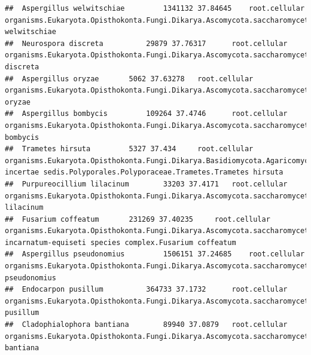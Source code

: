 \documentclass{article}\usepackage[]{graphicx}\usepackage[]{color}
\makeatletter
\newenvironment{kframe}{%
 \def\at@end@of@kframe{}%
 \ifinner\ifhmode%
  \def\at@end@of@kframe{\end{minipage}}%
  \begin{minipage}{\columnwidth}%
 \fi\fi%
 \def\FrameCommand##1{\hskip\@totalleftmargin \hskip-\fboxsep
 \colorbox{shadecolor}{##1}\hskip-\fboxsep
     \hskip-\linewidth \hskip-\@totalleftmargin \hskip\columnwidth}%
 \MakeFramed {\advance\hsize-\width
   \@totalleftmargin\z@ \linewidth\hsize
   \@setminipage}}%
 {\par\unskip\endMakeFramed%
 \at@end@of@kframe}
\newenvironment{knitrout}{}{} %
\makeatother
\begin{document}
\begin{knitrout}
\begin{kframe}
\begin{verbatim}
##  Aspergillus welwitschiae 		 1341132 37.84645 	 root.cellular organisms.Eukaryota.Opisthokonta.Fungi.Dikarya.Ascomycota.saccharomyceta.Pezizomycotina.leotiomyceta.Eurotiomycetes.Eurotiomycetidae.Eurotiales.Aspergillaceae.Aspergillus.Aspergillus welwitschiae
##  Neurospora discreta 		 29879 37.76317 	 root.cellular organisms.Eukaryota.Opisthokonta.Fungi.Dikarya.Ascomycota.saccharomyceta.Pezizomycotina.leotiomyceta.sordariomyceta.Sordariomycetes.Sordariomycetidae.Sordariales.Sordariaceae.Neurospora.Neurospora discreta
##  Aspergillus oryzae 		 5062 37.63278 	 root.cellular organisms.Eukaryota.Opisthokonta.Fungi.Dikarya.Ascomycota.saccharomyceta.Pezizomycotina.leotiomyceta.Eurotiomycetes.Eurotiomycetidae.Eurotiales.Aspergillaceae.Aspergillus.Circumdati.Aspergillus oryzae
##  Aspergillus bombycis 		 109264 37.4746 	 root.cellular organisms.Eukaryota.Opisthokonta.Fungi.Dikarya.Ascomycota.saccharomyceta.Pezizomycotina.leotiomyceta.Eurotiomycetes.Eurotiomycetidae.Eurotiales.Aspergillaceae.Aspergillus.Aspergillus bombycis
##  Trametes hirsuta 		 5327 37.434 	 root.cellular organisms.Eukaryota.Opisthokonta.Fungi.Dikarya.Basidiomycota.Agaricomycotina.Agaricomycetes.Agaricomycetes incertae sedis.Polyporales.Polyporaceae.Trametes.Trametes hirsuta
##  Purpureocillium lilacinum 		 33203 37.4171 	 root.cellular organisms.Eukaryota.Opisthokonta.Fungi.Dikarya.Ascomycota.saccharomyceta.Pezizomycotina.leotiomyceta.sordariomyceta.Sordariomycetes.Hypocreomycetidae.Hypocreales.Ophiocordycipitaceae.Purpureocillium.Purpureocillium lilacinum
##  Fusarium coffeatum 		 231269 37.40235 	 root.cellular organisms.Eukaryota.Opisthokonta.Fungi.Dikarya.Ascomycota.saccharomyceta.Pezizomycotina.leotiomyceta.sordariomyceta.Sordariomycetes.Hypocreomycetidae.Hypocreales.Nectriaceae.Fusarium.Fusarium incarnatum-equiseti species complex.Fusarium coffeatum
##  Aspergillus pseudonomius 		 1506151 37.24685 	 root.cellular organisms.Eukaryota.Opisthokonta.Fungi.Dikarya.Ascomycota.saccharomyceta.Pezizomycotina.leotiomyceta.Eurotiomycetes.Eurotiomycetidae.Eurotiales.Aspergillaceae.Aspergillus.Aspergillus pseudonomius
##  Endocarpon pusillum 		 364733 37.1732 	 root.cellular organisms.Eukaryota.Opisthokonta.Fungi.Dikarya.Ascomycota.saccharomyceta.Pezizomycotina.leotiomyceta.Eurotiomycetes.Chaetothyriomycetidae.Verrucariales.Verrucariaceae.Endocarpon.Endocarpon pusillum
##  Cladophialophora bantiana 		 89940 37.0879 	 root.cellular organisms.Eukaryota.Opisthokonta.Fungi.Dikarya.Ascomycota.saccharomyceta.Pezizomycotina.leotiomyceta.Eurotiomycetes.Chaetothyriomycetidae.Chaetothyriales.Herpotrichiellaceae.Cladophialophora.Cladophialophora bantiana

\end{verbatim}
\end{kframe}
\end{knitrout}
\end{document}
